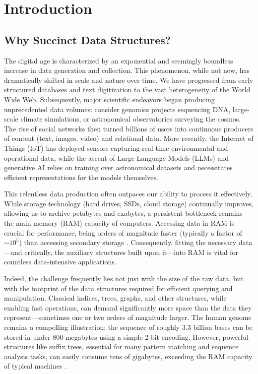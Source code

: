 
\chapter{Introduction} %

\label{ch:introduction} %

\section{Why Succinct Data Structures?}
\label{sec:why_succinct}

The digital age is characterized by an exponential and seemingly boundless increase in data generation and collection. This phenomenon, while not new, has dramatically shifted in scale and nature over time. We have progressed from early structured databases and text digitization to the vast heterogeneity of the World Wide Web. Subsequently, major scientific endeavors began producing unprecedented data volumes: consider genomics projects sequencing DNA, large-scale climate simulations, or astronomical observatories surveying the cosmos. The rise of social networks then turned billions of users into continuous producers of content (text, images, video) and relational data. More recently, the Internet of Things (IoT) has deployed sensors capturing real-time environmental and operational data, while the ascent of Large Language Models (LLMs) and generative AI relies on training over astronomical datasets and necessitates efficient representations for the models themselves.

This relentless data production often outpaces our ability to process it effectively. While storage technology (hard drives, SSDs, cloud storage) continually improves, allowing us to archive petabytes and exabytes, a persistent bottleneck remains the main memory (RAM) capacity of computers. Accessing data in RAM is crucial for performance, being orders of magnitude faster (typically a factor of $\sim 10^5$) than accessing secondary storage \cite{navarro2016compact}. Consequently, fitting the necessary data—and critically, the auxiliary structures built upon it—into RAM is vital for countless data-intensive applications.

Indeed, the challenge frequently lies not just with the size of the raw data, but with the footprint of the data structures required for efficient querying and manipulation. Classical indices, trees, graphs, and other structures, while enabling fast operations, can demand significantly more space than the data they represent—sometimes one or two orders of magnitude larger. The human genome remains a compelling illustration: the sequence of roughly 3.3 billion bases can be stored in under 800 megabytes using a simple 2-bit encoding. However, powerful structures like suffix trees, essential for many pattern matching and sequence analysis tasks, can easily consume tens of gigabytes, exceeding the RAM capacity of typical machines \cite{navarro2016compact}.

